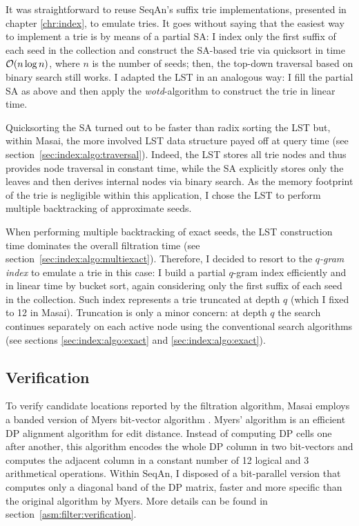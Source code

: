 It was straightforward to reuse SeqAn's suffix trie implementations, presented in chapter \ref{chr:index}, to emulate tries.
It goes without saying that the easiest way to implement a trie is by means of a partial SA:
I index only the first suffix of each seed in the collection and construct the SA-based trie via quicksort in time $\mathcal{O}(n \log n)$, where $n$ is the number of seeds; then, the top-down traversal based on binary search still works.
I adapted the LST in an analogous way: I fill the partial SA as above and then apply the \emph{wotd}-algorithm \citep{Giegerich1999} to construct the trie in linear time.

Quicksorting the SA turned out to be faster than radix sorting the LST but, within Masai, the more involved LST data structure payed off at query time (see section~\ref{sec:index:algo:traversal}).
Indeed, the LST stores all trie nodes and thus provides node traversal in constant time, while the SA explicitly stores only the leaves and then derives internal nodes via binary search.
As the memory footprint of the trie is negligible within this application, I chose the LST to perform multiple backtracking of approximate seeds.

When performing multiple backtracking of exact seeds, the LST construction time dominates the overall filtration time (see section~\ref{sec:index:algo:multiexact}).
Therefore, I decided to resort to the \emph{$q$-gram index} to emulate a trie in this case:
I build a partial $q$-gram index efficiently and in linear time by bucket sort, again considering only the first suffix of each seed in the collection.
Such index represents a trie truncated at depth $q$ (which I fixed to 12 in Masai).
Truncation is only a minor concern: at depth $q$ the search continues separately on each active node using the conventional search algorithms (see sections \ref{sec:index:algo:exact} and \ref{sec:index:algo:exact}).

\subsection{Verification}
\label{masai:engineering:extension}

To verify candidate locations reported by the filtration algorithm, Masai employs a banded version of Myers bit-vector algorithm \citep{Myers1999}.
Myers' algorithm is an efficient DP alignment algorithm \citep{Needleman1970} for edit distance. 
Instead of computing DP cells one after another, this algorithm encodes the whole DP column in two bit-vectors and computes the adjacent column in a constant number of 12 logical and 3 arithmetical operations.
Within SeqAn, I disposed of a bit-parallel version that computes only a diagonal band of the DP matrix, faster and more specific than the original algorithm by Myers.
More details can be found in section~\ref{asm:filter:verification}.

